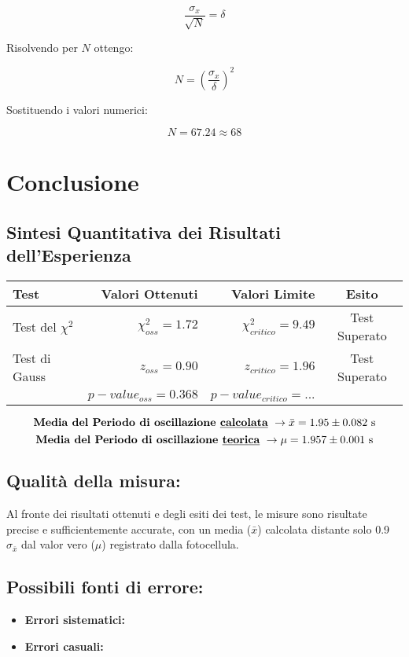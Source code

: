 \documentclass{article}
\begin{document}
\[\frac{\sigma_x}{\sqrt{N}} = \delta\]

\noindent Risolvendo per $N$ ottengo:

\[N = \left( \frac{\sigma_x}{\delta} \right)^2\]

\noindent Sostituendo i valori numerici:

\[N = 67.24 \approx 68 \]

\section{Conclusione}
\subsection{Sintesi Quantitativa dei Risultati dell'Esperienza}

\begin{table}[ht]
	\centering
	\begin{tabular}{|l|r|r|c|}
		\hline
		\textbf{Test} & \textbf{Valori Ottenuti} & \textbf{Valori Limite} & \textbf{Esito}  \\
		\hline
		Test del $\chi^2$ & $\chi^2_{oss} = 1.72$  & $\chi^2_{critico} = 9.49$ &  Test Superato \\
		\hline
		Test di Gauss & $z_{oss} = 0.90$ & $z_{critico} = 1.96$ & Test Superato \\
		& $p-value_{oss} = 0.368$ & $p-value_{critico} = ...$ &   \\
		\hline
	\end{tabular}
	\label{tab:sintesi_quantitativa}
\end{table}

\[ \text{\textbf{Media del Periodo di oscillazione \underline{calcolata}}  } \rightarrow \bar{x} = 1.95 \pm 0.082\text{ s} \]
\[ \text{\textbf{Media del Periodo di oscillazione \underline{teorica}}    } \rightarrow \mu = 1.957 \pm 0.001 \text{ s} \]

\subsection{Qualità della misura:}
Al fronte dei risultati ottenuti e degli esiti dei test, le misure sono risultate precise e sufficientemente accurate, con un media ($\bar{x}$) calcolata distante solo 0.9 $\sigma_{\bar{x}}$ dal valor vero ($\mu$) registrato dalla fotocellula.

\subsection{Possibili fonti di errore:}
\begin{itemize}
	\item \textbf{Errori sistematici:} 
	\item \textbf{Errori casuali:}
\end{itemize}
\end{document}
